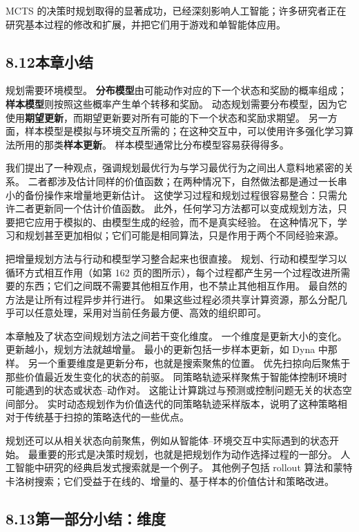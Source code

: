 \documentclass[UTF8,12pt,a4paper,fontset=fandol]{ctexart}
\begin{document}
MCTS 的决策时规划取得的显著成功，已经深刻影响人工智能；许多研究者正在研究基本过程的修改和扩展，并把它们用于游戏和单智能体应用。

\subsection*{8.12\quad 本章小结}

规划需要环境模型。
\textbf{分布模型}由可能动作对应的下一个状态和奖励的概率组成；\textbf{样本模型}则按照这些概率产生单个转移和奖励。
动态规划需要分布模型，因为它使用\textbf{期望更新}，而期望更新要对所有可能的下一个状态和奖励求期望。
另一方面，样本模型是模拟与环境交互所需的；在这种交互中，可以使用许多强化学习算法所用的那类\textbf{样本更新}。
样本模型通常比分布模型容易获得得多。

我们提出了一种观点，强调规划最优行为与学习最优行为之间出人意料地紧密的关系。
二者都涉及估计同样的价值函数；在两种情况下，自然做法都是通过一长串小的备份操作来增量地更新估计。
这使学习过程和规划过程很容易整合：只需允许二者更新同一个估计价值函数。
此外，任何学习方法都可以变成规划方法，只要把它应用于模拟的、由模型生成的经验，而不是真实经验。
在这种情况下，学习和规划甚至更加相似；它们可能是相同算法，只是作用于两个不同经验来源。

把增量规划方法与行动和模型学习整合起来也很直接。
规划、行动和模型学习以循环方式相互作用（如第 162 页的图所示），每个过程都产生另一个过程改进所需要的东西；它们之间既不需要其他相互作用，也不禁止其他相互作用。
最自然的方法是让所有过程异步并行进行。
如果这些过程必须共享计算资源，那么分配几乎可以任意处理，采用对当前任务最方便、高效的组织即可。

本章触及了状态空间规划方法之间若干变化维度。
一个维度是更新大小的变化。
更新越小，规划方法就越增量。
最小的更新包括一步样本更新，如 Dyna 中那样。
另一个重要维度是更新分布，也就是搜索聚焦的位置。
优先扫掠向后聚焦于那些价值最近发生变化的状态的前驱。
同策略轨迹采样聚焦于智能体控制环境时可能遇到的状态或状态--动作对。
这能让计算跳过与预测或控制问题无关的状态空间部分。
实时动态规划作为价值迭代的同策略轨迹采样版本，说明了这种策略相对于传统基于扫掠的策略迭代的一些优点。

规划还可以从相关状态向前聚焦，例如从智能体--环境交互中实际遇到的状态开始。
最重要的形式是决策时规划，也就是把规划作为动作选择过程的一部分。
人工智能中研究的经典启发式搜索就是一个例子。
其他例子包括 rollout 算法和蒙特卡洛树搜索；它们受益于在线的、增量的、基于样本的价值估计和策略改进。

\subsection*{8.13\quad 第一部分小结：维度}
\end{document}
